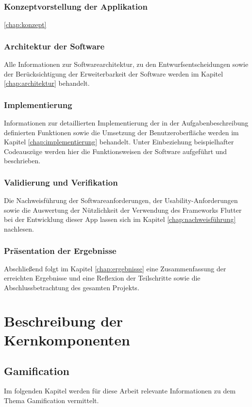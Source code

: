 \documentclass[bibliography=totoc,listof=totoc,BCOR=5mm,DIV=12,oneside]{scrbook}
\begin{document}
\subsection{Konzeptvorstellung der Applikation}
\par \ref{chap:konzept}


\subsection{Architektur der Software}
\par Alle Informationen zur Softwarearchitektur, zu den Entwurfsentscheidungen sowie der Berücksichtigung der Erweiterbarkeit der Software werden im Kapitel \ref{chap:architektur}  behandelt.

\subsection{Implementierung}
Informationen zur detaillierten Implementierung der in der Aufgabenbeschreibung definierten Funktionen sowie die Umsetzung der Benutzeroberfläche werden im Kapitel \ref{chap:implementierung} behandelt. Unter Einbeziehung beispielhafter Codeauszüge werden hier die Funktionsweisen der Software aufgeführt und beschrieben.

\subsection{Validierung und Verifikation}
Die Nachweisführung der Softwareanforderungen, der Usability-Anforderungen sowie die Auswertung der Nützlichkeit der Verwendung des Frameworks Flutter bei der Entwicklung dieser App lassen sich im Kapitel \ref{chap:nachweisführung} nachlesen.

\subsection{Präsentation der Ergebnisse}
Abschließend folgt im Kapitel \ref{chap:ergebnisse} eine Zusammenfassung der erreichten Ergebnisse und eine Reflexion der Teilschritte sowie die Abschlussbetrachtung des gesamten Projekts.

\chapter{Beschreibung der Kernkomponenten} 
\label{chap:grundlagenkapitel}
\section{Gamification} 
\label{sec:grundlagenkapitelGamification}
\par Im folgenden Kapitel werden für diese Arbeit relevante Informationen zu dem Thema Gamification vermittelt. 
\end{document}
